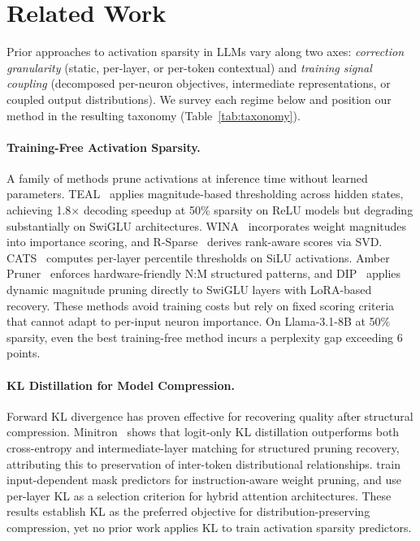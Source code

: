 \section{Related Work}
\label{sec:related}

Prior approaches to activation sparsity in LLMs vary along two axes: \emph{correction granularity} (static, per-layer, or per-token contextual) and \emph{training signal coupling} (decomposed per-neuron objectives, intermediate representations, or coupled output distributions). We survey each regime below and position our method in the resulting taxonomy (Table~\ref{tab:taxonomy}).

\paragraph{Training-Free Activation Sparsity.}
A family of methods prune activations at inference time without learned parameters.
TEAL~\cite{liu2025teal} applies magnitude-based thresholding across hidden states, achieving 1.8$\times$ decoding speedup at 50\% sparsity on ReLU models but degrading substantially on SwiGLU architectures.
WINA~\cite{wina2025} incorporates weight magnitudes into importance scoring, and R-Sparse~\cite{zhang2025rsparse} derives rank-aware scores via SVD.
CATS~\cite{lee2024cats} computes per-layer percentile thresholds on SiLU activations.
Amber Pruner~\cite{an2025amber} enforces hardware-friendly N:M structured patterns, and DIP~\cite{federici2025dip} applies dynamic magnitude pruning directly to SwiGLU layers with LoRA-based recovery.
These methods avoid training costs but rely on fixed scoring criteria that cannot adapt to per-input neuron importance.
On Llama-3.1-8B at 50\% sparsity, even the best training-free method incurs a perplexity gap exceeding 6 points.

\paragraph{KL Distillation for Model Compression.}
Forward KL divergence has proven effective for recovering quality after structural compression.
Minitron~\cite{muralidharan2024minitron} shows that logit-only KL distillation outperforms both cross-entropy and intermediate-layer matching for structured pruning recovery, attributing this to preservation of inter-token distributional relationships.
\citet{hou2025ifp} train input-dependent mask predictors for instruction-aware weight pruning, and \citet{distill2025hybrid} use per-layer KL as a selection criterion for hybrid attention architectures.
These results establish KL as the preferred objective for distribution-preserving compression, yet no prior work applies KL to train activation sparsity predictors.

